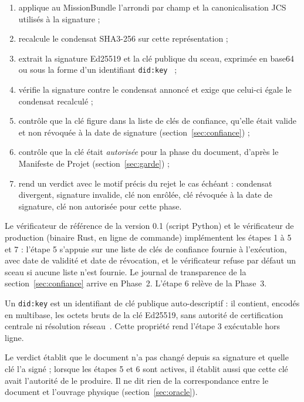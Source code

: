 \documentclass[11pt,a4paper]{article}
\begin{document}
\begin{enumerate}
  \item applique au MissionBundle l'arrondi par champ et la canonicalisation JCS utilisés à la signature ;
  \item recalcule le condensat SHA3-256 sur cette représentation ;
  \item extrait la signature Ed25519 et la clé publique du sceau, exprimée en base64 ou sous la forme d'un identifiant \texttt{did:key}~\cite{w3c_did_key} ;
  \item vérifie la signature contre le condensat annoncé et exige que celui-ci égale le condensat recalculé ;
  \item contrôle que la clé figure dans la liste de clés de confiance, qu'elle était valide et non révoquée à la date de signature (section~\ref{sec:confiance}) ;
  \item contrôle que la clé était \emph{autorisée} pour la phase du document, d'après le Manifeste de Projet (section~\ref{sec:garde}) ;
  \item rend un verdict avec le motif précis du rejet le cas échéant : condensat divergent, signature invalide, clé non enrôlée, clé révoquée à la date de signature, clé non autorisée pour cette phase.
\end{enumerate}

Le vérificateur de référence de la version 0.1 (script Python) et le vérificateur de production (binaire Rust, en ligne de commande) implémentent les étapes 1 à 5 et 7 : l'étape 5 s'appuie sur une liste de clés de confiance fournie à l'exécution, avec date de validité et date de révocation, et le vérificateur refuse par défaut un sceau si aucune liste n'est fournie. Le journal de transparence de la section~\ref{sec:confiance} arrive en Phase~2. L'étape 6 relève de la Phase~3.

Un \texttt{did:key} est un identifiant de clé publique auto-descriptif : il contient, encodés en multibase, les octets bruts de la clé Ed25519, sans autorité de certification centrale ni résolution réseau~\cite{w3c_did_key}. Cette propriété rend l'étape 3 exécutable hors ligne.

Le verdict établit que le document n'a pas changé depuis sa signature et quelle clé l'a signé ; lorsque les étapes 5 et 6 sont actives, il établit aussi que cette clé avait l'autorité de le produire. Il ne dit rien de la correspondance entre le document et l'ouvrage physique (section~\ref{sec:oracle}).

\end{document}

